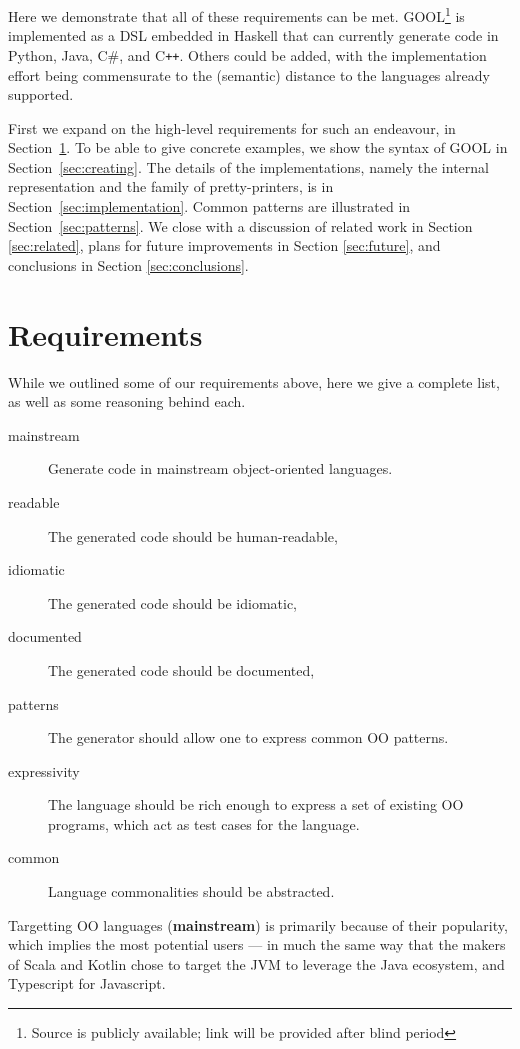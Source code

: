 \documentclass[sigplan,review,anonymous,prologue,dvipsnames]{acmart}
\newcommand{\Csharp}{C\#}
\newcommand{\Cplusplus}{C\texttt{++}}
\newcommand{\abbrev}[1]{\textbf{#1}}
\newcommand{\mainstream}{\abbrev{mainstream}}
\begin{document}
Here we demonstrate that all of these requirements can be met.
GOOL\footnote{Source is publicly available; link will be
provided after blind period}
is implemented as a DSL embedded in Haskell that
can currently generate code in Python, Java, \Csharp, and \Cplusplus.
Others could be added, with the implementation effort being commensurate to the
(semantic) distance to the languages already supported.

First we expand on the high-level requirements for such an endeavour, in
Section~\ref{sec:req}.  To be able to give concrete examples, we
show the syntax of GOOL in Section~\ref{sec:creating}. The details of
the implementations, namely the internal representation and the
family of pretty-printers, is in Section~\ref{sec:implementation}.
Common patterns are illustrated in Section~\ref{sec:patterns}.  We
close with a discussion of related work in Section \ref{sec:related}, plans for
future improvements in Section \ref{sec:future}, and conclusions in Section
\ref{sec:conclusions}.

\section{Requirements} \label{sec:req}

While we outlined some of our requirements above, here we give a
complete list, as well as some reasoning behind each.

\begin{description}
\item[mainstream] Generate code in mainstream object-oriented languages.
\item[readable] The generated code should be human-readable,
\item[idiomatic] The generated code should be idiomatic,
\item[documented] The generated code should be documented,
\item[patterns] The generator should allow one to express common OO patterns.
\item[expressivity] The language should be rich enough to express a
set of existing OO programs, which act as test cases for the language.
\item[common] Language commonalities should be abstracted.
\end{description}

Targetting OO languages (\mainstream) is primarily because of their popularity,
which implies the most potential users --- in much the same way that the makers
of Scala and Kotlin chose to target the JVM to leverage the Java ecosystem, and
Typescript for Javascript.
\end{document}

